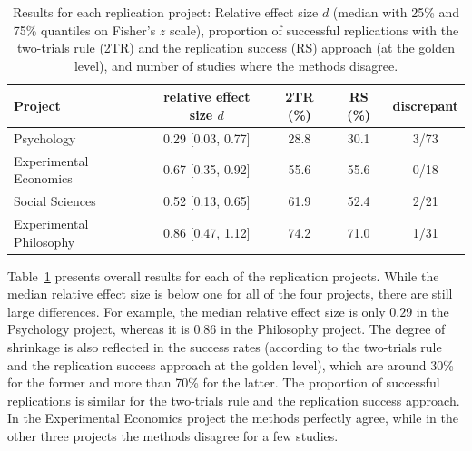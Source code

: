 \begin{table}[!ht]
    \centering
\caption{Results for each replication project:
Relative effect size $d$ (median with 25\% and 75\% quantiles on Fisher's $z$ scale), proportion of
successful replications with the two-trials rule (2TR) and the replication success (RS)
approach (at the golden level), and number of studies where the methods disagree.}
\begin{tabular}{lcccc}
  \toprule
Project & relative effect size $d$ & 2TR (\%) & RS (\%) & discrepant \\
  \midrule
Psychology & 0.29 [0.03, 0.77] & 28.8 & 30.1 & 3/73 \\
  Experimental Economics & 0.67 [0.35, 0.92] & 55.6 & 55.6 & 0/18 \\
  Social Sciences & 0.52 [0.13, 0.65] & 61.9 & 52.4 & 2/21 \\
  Experimental Philosophy & 0.86 [0.47, 1.12] & 74.2 & 71.0 & 1/31 \\
   \bottomrule
\end{tabular}

\label{tab:marginalres}
\end{table}

Table~\ref{tab:marginalres} presents overall results for each of the replication
projects. While the median relative effect size is below one for all of the four
projects, there are still large differences. For example, the median relative
effect size is only $0.29$ in the Psychology project, whereas it is $0.86$ in
the Philosophy project. The degree of shrinkage is also reflected in the success
rates (according to the two-trials rule and the replication success approach at
the golden level), which are around 30\% for the former and more than 70\% for
the latter. The proportion of successful replications is similar for the
two-trials rule and the replication success approach. In the Experimental
Economics project the methods perfectly agree, while in the other three projects
the methods disagree for a few studies.

